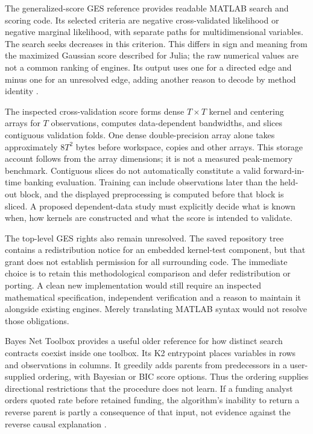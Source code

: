 The generalized-score GES reference provides readable MATLAB search and
scoring code. Its selected criteria are negative cross-validated likelihood
or negative marginal likelihood, with separate paths for multidimensional
variables. The search seeks decreases in this criterion. This differs in
sign and meaning from the maximized Gaussian score described for Julia;
the raw numerical values are not a common ranking of engines. Its output
uses one for a directed edge and minus one for an unresolved edge, adding
another reason to decode by method identity
\citep{exec13_other_generalized}.

The inspected cross-validation score forms dense $T\times T$ kernel and
centering arrays for $T$ observations, computes data-dependent bandwidths,
and slices contiguous validation folds. One dense double-precision array
alone takes approximately $8T^2$ bytes before workspace, copies and other
arrays. This storage account follows from the array dimensions; it is not
a measured peak-memory benchmark. Contiguous slices do not automatically
constitute a valid forward-in-time banking evaluation. Training can include
observations later than the held-out block, and the displayed preprocessing
is computed before that block is sliced. A proposed dependent-data study
must explicitly decide what is known when, how kernels are constructed and
what the score is intended to validate.

The top-level GES rights also remain unresolved. The saved repository tree
contains a redistribution notice for an embedded kernel-test component,
but that grant does not establish permission for all surrounding code.
The immediate choice is to retain this methodological comparison and defer
redistribution or porting. A clean new implementation would still require
an inspected mathematical specification, independent verification and a
reason to maintain it alongside existing engines. Merely translating MATLAB
syntax would not resolve those obligations.

Bayes Net Toolbox provides a useful older reference for how distinct search
contracts coexist inside one toolbox. Its K2 entrypoint places variables in
rows and observations in columns. It greedily adds parents from predecessors
in a user-supplied ordering, with Bayesian or BIC score options. Thus the
ordering supplies directional restrictions that the procedure does not
learn. If a funding analyst orders quoted rate before retained funding,
the algorithm's inability to return a reverse parent is partly a consequence
of that input, not evidence against the reverse causal explanation
\citep{exec13_other_bnt}.

